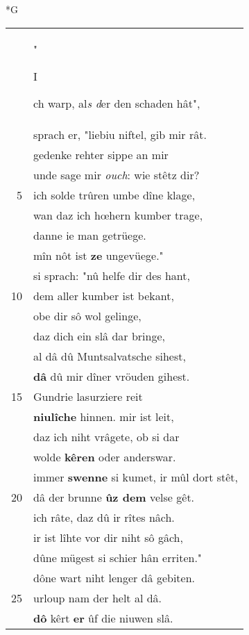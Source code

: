 \documentclass[8pt,a4paper,notitlepage]{article}
\begin{document}
\begin{table}[ht]
\begin{minipage}[t]{0.5\linewidth}
\end{minipage}
\end{table}
\newpage
\begin{table}[ht]
\begin{minipage}[t]{0.5\linewidth}
\small
\begin{center}*G
\end{center}
\begin{tabular}{rl}
 & "\begin{large}I\end{large}ch warp, al\textit{s d}er den schaden hât",\\ 
 & sprach er, "liebiu niftel, gib mir rât.\\ 
 & gedenke rehter sippe an mir\\ 
 & unde sage mir \textit{ouch}: wie stêtz dir?\\ 
5 & ich solde trûren umbe dîne klage,\\ 
 & wan daz ich hœhern kumber trage,\\ 
 & danne ie man getrüege.\\ 
 & mîn nôt ist \textbf{ze} ungevüege."\\ 
 & si sprach: "nû helfe dir des hant,\\ 
10 & dem aller kumber ist bekant,\\ 
 & obe dir sô wol gelinge,\\ 
 & daz dich ein slâ dar bringe,\\ 
 & al dâ dû Muntsalvatsche sihest,\\ 
 & \textbf{dâ} dû mir dîner vröuden gihest.\\ 
15 & Gundrie lasurziere reit\\ 
 & \textbf{niulîche} hinnen. mir ist leit,\\ 
 & daz ich niht vrâgete, ob si dar\\ 
 & wolde \textbf{kêren} oder anderswar.\\ 
 & immer \textbf{swenne} si kumet, ir mûl dort stêt,\\ 
20 & dâ der brunne \textbf{ûz dem} velse gêt.\\ 
 & ich râte, daz dû ir rîtes nâch.\\ 
 & ir ist lîhte vor dir niht sô gâch,\\ 
 & dûne mügest si schier hân erriten."\\ 
 & dône wart niht lenger dâ gebiten.\\ 
25 & urloup nam der helt al dâ.\\ 
 & \textbf{dô} kêrt \textbf{er} ûf die niuwen slâ.\\ 

\end{tabular}
\end{minipage}
\end{table}
\end{document}
